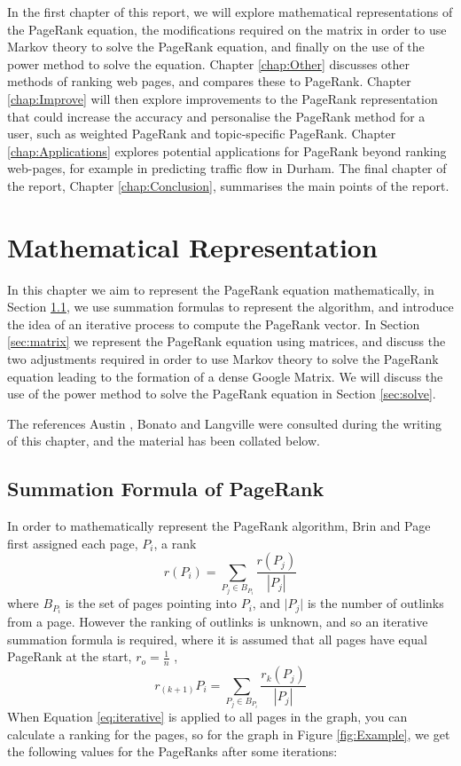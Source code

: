 \documentclass[11pt]{report}
\begin{document}
In the first chapter of this report, we will explore mathematical representations of the PageRank equation, the modifications required on the matrix in order to use Markov theory to solve the PageRank equation, and finally on the use of the power method to solve the equation. Chapter \ref{chap:Other} discusses other methods of ranking web pages, and compares these to PageRank. Chapter \ref{chap:Improve} will then explore improvements to the PageRank representation that could increase the accuracy and personalise the PageRank method for a user, such as weighted PageRank and topic-specific PageRank. Chapter \ref{chap:Applications} explores potential applications for PageRank beyond ranking web-pages, for example in predicting traffic flow in Durham. The final chapter of the report, Chapter \ref{chap:Conclusion}, summarises the main points of the report.



\chapter{Mathematical Representation} \label{chap:Math}
In this chapter we aim to represent the PageRank equation mathematically, in Section \ref{sec:summ}, we use summation formulas to represent the algorithm, and introduce the idea of an iterative process to compute the PageRank vector. In Section \ref{sec:matrix} we represent the PageRank equation using matrices, and discuss the two adjustments required in order to use Markov theory to solve the PageRank equation leading to the formation of a dense Google Matrix. We will discuss the use of the power method to solve the PageRank equation in Section \ref{sec:solve}.

The references Austin \cite{austin}, Bonato \cite{bonato} and Langville \cite{langville} were consulted during the writing of this chapter, and the material has been collated below.  

\section{Summation Formula of PageRank} \label{sec:summ}
In order to mathematically represent the PageRank algorithm, Brin and Page first assigned each page, $P_i$, a rank
\begin{equation}
r(P_i) = \displaystyle \sum_{P_j\in B_{P_i }} \frac{r(P_j)}{|P_j|}
\end{equation} where $B_{P_i}$ is the set of pages pointing into $P_i$, and $\vert P_j\vert$ is the number of outlinks from a page. However the ranking of outlinks is unknown, and so an iterative summation formula is required, where it is assumed that all pages have equal PageRank at the start, \(r_o = \frac{1}{n}\) , \begin{equation} \label{eq:iterative}
r_{(k+1)}P_i = \displaystyle \sum_{P_j\in B_{P_i }}\frac{r_k(P_j)}{|P_j|}
\end{equation} 
When Equation \eqref{eq:iterative} is applied to all pages in the graph, you can calculate a ranking for the pages, so for the graph in Figure \ref{fig:Example}, we get the following values for the PageRanks after some iterations: 
\end{document}
